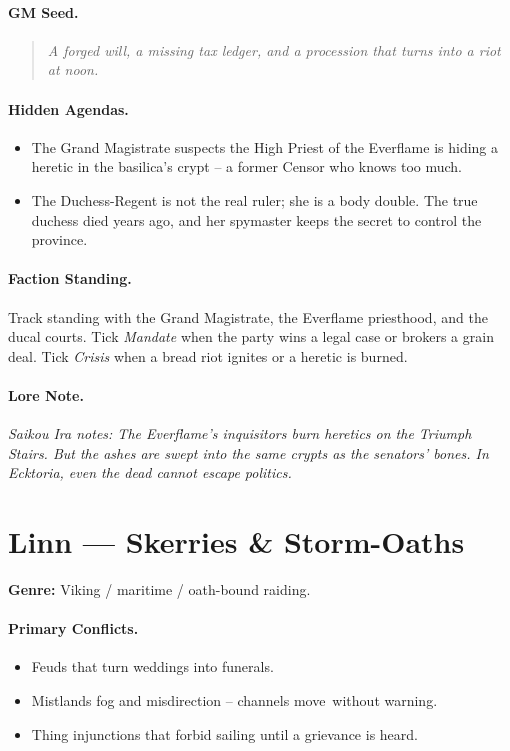 \paragraph{GM Seed.}
\begin{quote}
\emph{A forged will, a missing tax ledger, and a procession that turns into a riot at noon.}
\end{quote}

\paragraph{Hidden Agendas.}
\begin{itemize}
  \item The Grand Magistrate suspects the High Priest of the Everflame is hiding a heretic in the basilica's crypt -- a former Censor who knows too much.
  \item The Duchess-Regent is not the real ruler; she is a body double. The true duchess died years ago, and her spymaster keeps the secret to control the province.
\end{itemize}

\paragraph{Faction Standing.}
Track standing with the Grand Magistrate, the Everflame priesthood, and the ducal courts. Tick \textit{Mandate} when the party wins a legal case or brokers a grain deal. Tick \textit{Crisis} when a bread riot ignites or a heretic is burned.

\paragraph{Lore Note.}
\emph{Saikou Ira notes: \textquotedbl The Everflame's inquisitors burn heretics on the Triumph Stairs. But the ashes are swept into the same crypts as the senators' bones. In Ecktoria, even the dead cannot escape politics.\textquotedbl}

\section{Linn --- \textquotedbl Skerries \& Storm-Oaths\textquotedbl}
\textbf{Genre:} Viking / maritime / oath-bound raiding.

\paragraph{Primary Conflicts.}
\begin{itemize}
  \item Feuds that turn weddings into funerals.
  \item Mistlands fog and misdirection -- channels \textquotedbl move\textquotedbl\ without warning.
  \item Thing injunctions that forbid sailing until a grievance is heard.
\end{itemize}

